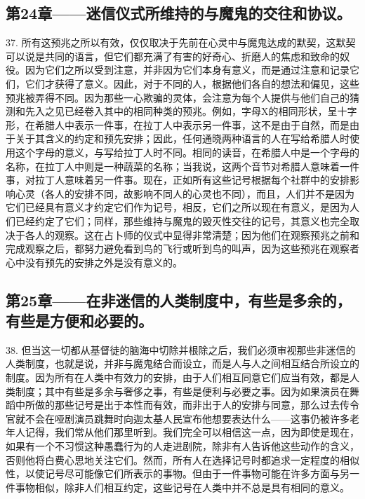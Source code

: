
\subsection{第24章——迷信仪式所维持的与魔鬼的交往和协议。}

37. 所有这预兆之所以有效，仅仅取决于先前在心灵中与魔鬼达成的默契，这默契可以说是共同的语言，但它们都充满了有害的好奇心、折磨人的焦虑和致命的奴役。因为它们之所以受到注意，并非因为它们本身有意义，而是通过注意和记录它们，它们才获得了意义。因此，对于不同的人，根据他们各自的想法和偏见，这些预兆被弄得不同。因为那些一心欺骗的灵体，会注意为每个人提供与他们自己的猜测和先入之见已经卷入其中的相同种类的预兆。例如，字母X的相同形状，呈十字形，在希腊人中表示一件事，在拉丁人中表示另一件事，这不是由于自然，而是由于关于其含义的约定和预先安排；因此，任何通晓两种语言的人在写给希腊人时使用这个字母的意义，与写给拉丁人时不同。相同的读音，在希腊人中是一个字母的名称，在拉丁人中则是一种蔬菜的名称；当我说，这两个音节对希腊人意味着一件事，对拉丁人意味着另一件事。现在，正如所有这些记号根据每个社群中的安排影响心灵（各人的安排不同，故影响不同人的心灵也不同），而且，人们并不是因为它们已经具有意义才约定它们作为记号，相反，它们之所以现在有意义，是因为人们已经约定了它们；同样，那些维持与魔鬼的毁灭性交往的记号，其意义也完全取决于各人的观察。这在占卜师的仪式中显得非常清楚；因为他们在观察预兆之前和完成观察之后，都努力避免看到鸟的飞行或听到鸟的叫声，因为这些预兆在观察者心中没有预先的安排之外是没有意义的。\par


\subsection{第25章——在非迷信的人类制度中，有些是多余的，有些是方便和必要的。}

38. 但当这一切都从基督徒的脑海中切除并根除之后，我们必须审视那些非迷信的人类制度，也就是说，并非与魔鬼结合而设立，而是人与人之间相互结合所设立的制度。因为所有在人类中有效力的安排，由于人们相互同意它们应当有效，都是人类制度；其中有些是多余与奢侈之事，有些是便利与必要之事。因为如果演员在舞蹈中所做的那些记号是出于本性而有效，而非出于人的安排与同意，那么过去传令官就不会在哑剧演员跳舞时向迦太基人民宣布他想要表达什么——这事仍被许多老年人记得，我们常从他们那里听到。我们完全可以相信这一点，因为即使是现在，如果有一个不习惯这种愚蠢行为的人走进剧院，除非有人告诉他这些动作的含义，否则他将白费心思地关注它们。然而，所有人在选择记号时都追求一定程度的相似性，以使记号尽可能像它们所表示的事物。但由于一件事物可能在许多方面与另一件事物相似，除非人们相互约定，这些记号在人类中并不总是具有相同的意义。\par

